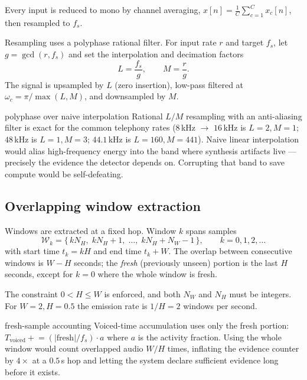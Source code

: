 \documentclass[11pt,a4paper]{article}
\begin{document}
Every input is reduced to mono by channel averaging,
$x[n] = \frac{1}{C}\sum_{c=1}^{C} x_c[n]$, then resampled to $f_s$.

Resampling uses a polyphase rational filter. For input rate $r$ and target $f_s$,
let $g=\gcd(r,f_s)$ and set the interpolation and decimation factors
\begin{equation}
L = \frac{f_s}{g}, \qquad M = \frac{r}{g}.
\end{equation}
The signal is upsampled by $L$ (zero insertion), low-pass filtered at
$\omega_c = \pi/\max(L,M)$, and downsampled by $M$.

\begin{whybox}{polyphase over naive interpolation}
Rational $L/M$ resampling with an anti-aliasing filter is exact for the common
telephony rates ($8$\,kHz $\to$ $16$\,kHz is $L{=}2, M{=}1$; $48$\,kHz is
$L{=}1,M{=}3$; $44.1$\,kHz is $L{=}160,M{=}441$). Naive linear interpolation would
alias high-frequency energy into the band where synthesis artifacts live --- precisely
the evidence the detector depends on. Corrupting that band to save compute would be
self-defeating.
\end{whybox}

\subsection{Overlapping window extraction}

Windows are extracted at a fixed hop. Window $k$ spans samples
\begin{equation}
\mathcal{W}_k = \{\,kN_H,\; kN_H+1,\; \ldots,\; kN_H + N_W - 1\,\},
\qquad k = 0,1,2,\ldots
\end{equation}
with start time $t_k = kH$ and end time $t_k + W$. The overlap between consecutive
windows is $W-H$ seconds; the \emph{fresh} (previously unseen) portion is the last
$H$ seconds, except for $k=0$ where the whole window is fresh.

The constraint $0 < H \le W$ is enforced, and both $N_W$ and $N_H$ must be integers.
For $W=2, H=0.5$ the emission rate is $1/H = 2$ windows per second.

\begin{whybox}{fresh-sample accounting}
Voiced-time accumulation uses only the fresh portion:
$T_{\text{voiced}} \mathrel{+}= (|\text{fresh}|/f_s)\cdot a$ where $a$ is the activity
fraction. Using the whole window would count overlapped audio $W/H$ times, inflating
the evidence counter by $4\times$ at a $0.5$\,s hop and letting the system declare
sufficient evidence long before it exists.
\end{whybox}
\end{document}
